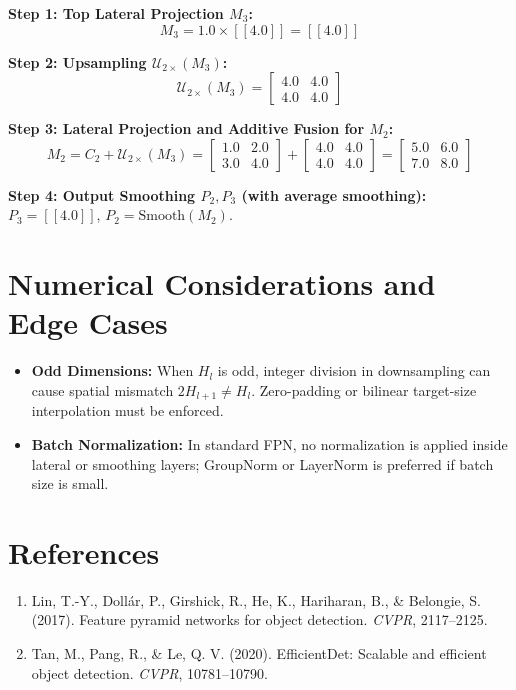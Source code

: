 \documentclass[11pt,a4paper]{article}
\theoremstyle{definition}
\begin{document}
\textbf{Step 1: Top Lateral Projection $M_3$:}
\begin{equation}
M_3 = 1.0 \times [[4.0]] = [[4.0]]
\end{equation}

\textbf{Step 2: Upsampling $\mathcal{U}_{2\times}(M_3)$:}
\begin{equation}
\mathcal{U}_{2\times}(M_3) = \begin{bmatrix} 4.0 & 4.0 \\ 4.0 & 4.0 \end{bmatrix}
\end{equation}

\textbf{Step 3: Lateral Projection and Additive Fusion for $M_2$:}
\begin{equation}
M_2 = C_2 + \mathcal{U}_{2\times}(M_3) = \begin{bmatrix} 1.0 & 2.0 \\ 3.0 & 4.0 \end{bmatrix} + \begin{bmatrix} 4.0 & 4.0 \\ 4.0 & 4.0 \end{bmatrix} = \begin{bmatrix} 5.0 & 6.0 \\ 7.0 & 8.0 \end{bmatrix}
\end{equation}

\textbf{Step 4: Output Smoothing $P_2, P_3$ (with average smoothing):}
$P_3 = [[4.0]]$, $P_2 = \text{Smooth}(M_2)$.

\section{Numerical Considerations and Edge Cases}

\begin{itemize}
    \item \textbf{Odd Dimensions:} When $H_l$ is odd, integer division in downsampling can cause spatial mismatch $2 H_{l+1} \ne H_l$. Zero-padding or bilinear target-size interpolation must be enforced.
    \item \textbf{Batch Normalization:} In standard FPN, no normalization is applied inside lateral or smoothing layers; GroupNorm or LayerNorm is preferred if batch size is small.
\end{itemize}

\section{References}
\begin{enumerate}
    \item Lin, T.-Y., Doll{\'a}r, P., Girshick, R., He, K., Hariharan, B., \& Belongie, S. (2017). Feature pyramid networks for object detection. \emph{CVPR}, 2117--2125.
    \item Tan, M., Pang, R., \& Le, Q. V. (2020). EfficientDet: Scalable and efficient object detection. \emph{CVPR}, 10781--10790.
\end{enumerate}
\end{document}
